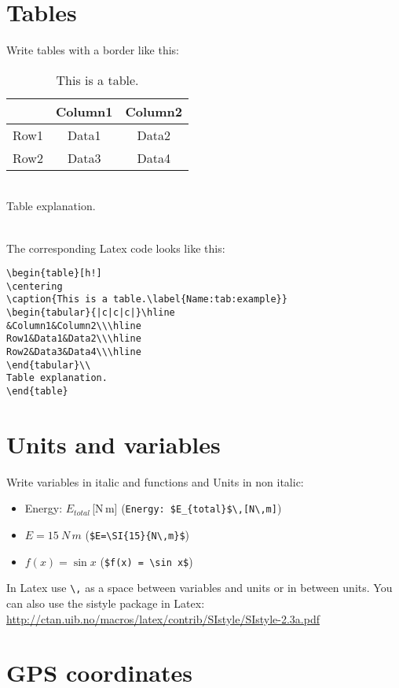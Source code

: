 \documentclass[12pt,a4paper,notitlepage]{scrreprt}
\begin{document}
\section*{Tables}
Write tables with a border like this:
\begin{table}[h!]
\centering
\caption{This is a table.\label{Name:tab:example}}
\begin{tabular}{|c||c|c|}\hline
&Column1&Column2\\\hline\hline
Row1&Data1&Data2\\\hline
Row2&Data3&Data4\\\hline
\end{tabular}\\
Table explanation.
\end{table}\\
The corresponding Latex code looks like this:
\begin{verbatim}
\begin{table}[h!]
\centering
\caption{This is a table.\label{Name:tab:example}}
\begin{tabular}{|c|c|c|}\hline
&Column1&Column2\\\hline
Row1&Data1&Data2\\\hline
Row2&Data3&Data4\\\hline
\end{tabular}\\
Table explanation.
\end{table}
\end{verbatim}

\section*{Units and variables}
Write variables in italic and functions and Units in non italic:
\begin{itemize}
\item Energy: $E_{total}$\,[N\,m] (\verb#Energy: $E_{total}$\,[N\,m]#)
\item $E=\SI{15}{N\,m}$ (\verb#$E=\SI{15}{N\,m}$#)
\item $f(x) = \sin x$ (\verb#$f(x) = \sin x$#)
\end{itemize}
In Latex use \texttt{\textbackslash,} as a space between variables and units or in between units. You can also use the sistyle package in Latex: \url{http://ctan.uib.no/macros/latex/contrib/SIstyle/SIstyle-2.3a.pdf}


\section*{GPS coordinates}
\end{document}
